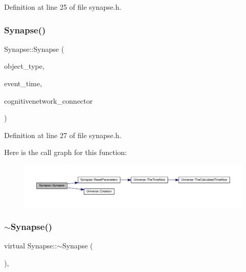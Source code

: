 Definition at line 25 of file synapse.\+h.

\mbox{\label{class_synapse_ab651f847b74235df5121fe42faf3f253}} 
\subsubsection{\texorpdfstring{Synapse()}{Synapse()}\hspace{0.1cm}{\footnotesize\ttfamily [4/4]}}
{\footnotesize\ttfamily Synapse\+::\+Synapse (\begin{DoxyParamCaption}\item[{unsigned int}]{object\+\_\+type,  }\item[{std\+::chrono\+::time\+\_\+point$<$ \hyperlink{universe_8h_a0ef8d951d1ca5ab3cfaf7ab4c7a6fd80}{Clock} $>$}]{event\+\_\+time,  }\item[{\hyperlink{class_cognitive_network}{Cognitive\+Network} \&}]{cognitivenetwork\+\_\+connector }\end{DoxyParamCaption})\hspace{0.3cm}{\ttfamily [inline]}}



Definition at line 27 of file synapse.\+h.

Here is the call graph for this function\+:
\nopagebreak
\begin{figure}[H]
\begin{center}
\leavevmode
\includegraphics[width=350pt]{class_synapse_ab651f847b74235df5121fe42faf3f253_cgraph}
\end{center}
\end{figure}
\mbox{\label{class_synapse_a882bfd0fbb2aead46c1410ab310920e5}} 
\subsubsection{\texorpdfstring{$\sim$\+Synapse()}{~Synapse()}}
{\footnotesize\ttfamily virtual Synapse\+::$\sim$\+Synapse (\begin{DoxyParamCaption}{ }\end{DoxyParamCaption})\hspace{0.3cm}{\ttfamily [inline]}, {\ttfamily [virtual]}}

